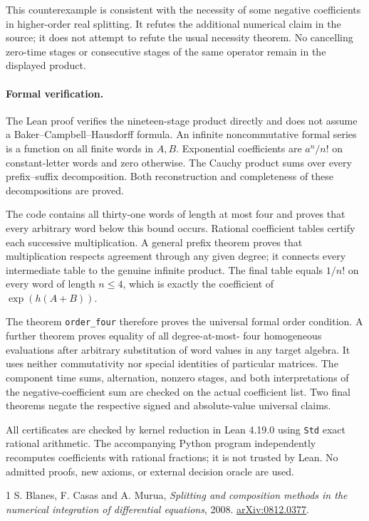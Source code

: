 \documentclass[11pt]{article}
\begin{document}
This counterexample is consistent with the necessity of some negative
coefficients in higher-order real splitting. It refutes the additional
numerical claim in the source; it does not attempt to refute the usual
necessity theorem. No cancelling zero-time stages or consecutive stages
of the same operator remain in the displayed product.

\paragraph{Formal verification.}
The Lean proof verifies the nineteen-stage product directly and does not
assume a Baker--Campbell--Hausdorff formula. An infinite noncommutative
formal series is a function on all finite words in $A,B$. Exponential
coefficients are $a^n/n!$ on constant-letter words and zero otherwise.
The Cauchy product sums over every prefix--suffix decomposition. Both
reconstruction and completeness of these decompositions are proved.

The code contains all thirty-one words of length at most four and proves
that every arbitrary word below this bound occurs. Rational coefficient
tables certify each successive multiplication. A general prefix theorem
proves that multiplication respects agreement through any given degree;
it connects every intermediate table to the genuine infinite product.
The final table equals $1/n!$ on every word of length $n\leq4$, which is
exactly the coefficient of $\exp(h(A+B))$.

The theorem \texttt{order\_four} therefore proves the universal formal
order condition. A further theorem proves equality of all degree-at-most-
four homogeneous evaluations after arbitrary substitution of word values
in any target algebra. It uses neither commutativity nor special identities
of particular matrices. The component time sums, alternation, nonzero
stages, and both interpretations of the negative-coefficient sum are
checked on the actual coefficient list. Two final theorems negate the
respective signed and absolute-value universal claims.

All certificates are checked by kernel reduction in Lean 4.19.0 using
\texttt{Std} exact rational arithmetic. The accompanying Python program
independently recomputes coefficients with rational fractions; it is not
trusted by Lean. No admitted proofs, new axioms, or external decision
oracle are used.
\begin{thebibliography}{1}
 S. Blanes, F. Casas and A. Murua,
\emph{Splitting and composition methods in the numerical integration
of differential equations}, 2008.
\href{https://arxiv.org/abs/0812.0377}{arXiv:0812.0377}.
\end{thebibliography}
\end{document}
